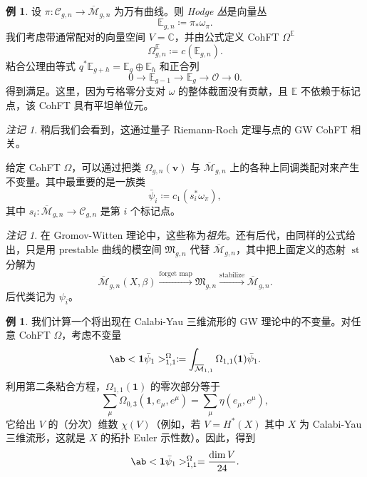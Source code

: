 \documentclass{amsart}
\theoremstyle{definition}
\newtheorem{exm}[thm]{例}
\theoremstyle{remark}
\newtheorem{rmk}[thm]{注记}
\theoremstyle{plain}
\theoremstyle{definition}
\theoremstyle{remark}
\newcommand{\C}{\mathbb{C}}
\newcommand{\E}{\mathbb{E}}
\newcommand{\Mbar}{\overline{\mathcal{M}}}
\newcommand{\mc}[1]{\mathcal{#1}}
\newcommand{\mf}[1]{\mathfrak{#1}}
\newcommand{\mbf}[1]{\mathbf{#1}}
\newcommand{\bv}{\mbf{v}}
\newcommand{\1}{\mathbf{1}}
\newcommand{\2}{\mathbf{2}}
\newcommand{\3}{\mathbf{3}}
\DeclareMathOperator{\st}{st}
\begin{document}
\begin{exm}
    设 \(\pi \colon \mc{C}_{g,n} \to \Mbar_{g,n}\) 为万有曲线。则 \textit{Hodge 丛}是向量丛
    \[ \E_{g,n} \coloneqq \pi_* \omega_{\pi}. \]
    我们考虑带通常配对的向量空间 \(V = \C\)，并由公式定义 CohFT \(\Omega^{\E}\)
    \[ \Omega^{\E}_{g,n} \coloneqq c(\E_{g,n}). \]
    粘合公理由等式 \(q^* \E_{g+h} = \E_g \oplus \E_h\) 和正合列
    \[ 0 \to \E_{g-1} \to \E_g \to \mc{O} \to 0. \]
    得到满足。这里，因为亏格零分支对 \(\omega\) 的整体截面没有贡献，且 \(\E\) 不依赖于标记点，该 CohFT 具有平坦单位元。
\end{exm}

\begin{rmk}
    稍后我们会看到，这通过量子 Riemann-Roch 定理与点的 GW CohFT 相关。
\end{rmk}

给定 CohFT \(\Omega\)，可以通过把类 \(\Omega_{g,n}(\bv)\) 与 \(\Mbar_{g,n}\) 上的各种上同调类配对来产生不变量。其中最重要的是一族类
\[ \bar{\psi}_i \coloneqq c_1( s_i^* \omega_{\pi} ), \]
其中 \(s_i \colon \Mbar_{g,n} \to \mc{C}_{g,n}\) 是第 \(i\) 个标记点。

\begin{rmk}
    在 Gromov-Witten 理论中，这些称为\textit{祖先}。还有后代，由同样的公式给出，只是用 prestable 曲线的模空间 \(\mf{M}_{g,n}\) 代替 \(\Mbar_{g,n}\)，其中把上面定义的态射 \(\st\) 分解为
    \[ \Mbar_{g,n}(X,\beta) \xrightarrow{\text{forget map}} \mf{M}_{g,n} \xrightarrow{\text{stabilize}} \Mbar_{g,n}. \]
    后代类记为 \(\psi_i\)。
\end{rmk}

\begin{exm}
    我们计算一个将出现在 Calabi-Yau 三维流形的 GW 理论中的不变量。对任意 CohFT \(\Omega\)，考虑不变量
    \[ \ab<\1\bar{\psi}_1>_{1,1}^{\Omega}\coloneqq \int_{\Mbar_{1,1}} \Omega_{1,1}(\1)\bar{\psi}_1. \]
    利用第二条粘合方程，\(\Omega_{1,1}(\1)\) 的零次部分等于
    \[ \sum_{\mu} \Omega_{0,3}(\1, e_{\mu}, e^{\mu}) = \sum_{\mu} \eta(e_{\mu}, e^{\mu}), \]
    它给出 \(V\) 的（分次）维数 \(\chi(V)\)（例如，若 \(V = H^*(X)\) 其中 \(X\) 为 Calabi-Yau 三维流形，这就是 \(X\) 的拓扑 Euler 示性数）。因此，得到
    \[ \ab<\1\bar{\psi}_1>_{1,1}^{\Omega} = \frac{\dim V}{24}. \]
\end{exm}
\end{document}
